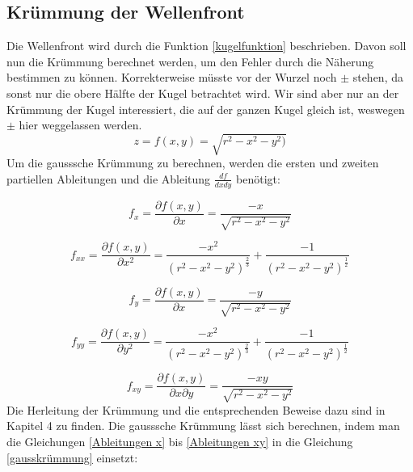 \begin{refsection}
\subsection{Krümmung der Wellenfront}
Die Wellenfront wird durch die Funktion \eqref{kugelfunktion} beschrieben. Davon soll nun die Krümmung berechnet werden, um den Fehler durch die Näherung bestimmen zu können. Korrekterweise müsste vor der Wurzel noch $\pm$ stehen, da sonst nur die obere Hälfte der Kugel betrachtet wird. Wir sind aber nur an der Krümmung der Kugel interessiert, die auf der ganzen Kugel gleich ist, weswegen  $\pm$ hier weggelassen werden.
\begin{equation}\label{kugelfunktion}
z=f(x,y)=\sqrt{r^{2}-x^{2}-y^{2})}
\end{equation}
Um die gausssche Krümmung zu berechnen, werden die ersten und zweiten partiellen Ableitungen und die Ableitung $ \frac{df}{dxdy}$ benötigt:

\begin{equation}\label{Ableitungen x}
f_{x}=\dfrac{\partial f(x,y)}{\partial x}= \dfrac{-x}{\sqrt{r^{2}-x^{2}-y^{2}}}
\end{equation}

\begin{equation}\label{Ableitungen xx}
f_{xx}=\dfrac{\partial f(x,y)}{\partial x^{2}}= \dfrac{- x^2}{(r^2 - x^2 - y^2)^{\frac{2}{3}}}+\dfrac{ - 1}{(r^2 - x^2 - y^2)^{\frac{1}{2}}}
\end{equation}

\begin{equation}\label{Ableitungen y}
f_{y} =\dfrac{\partial f(x,y)}{\partial x}= \dfrac{-y}{\sqrt{r^{2}-x^{2}-y^{2}}}
\end{equation}

\begin{equation}\label{Ableitungen yy}
f_{yy}=\dfrac{\partial f(x,y)}{\partial y^{2}}= \dfrac{- x^2}{(r^2 - x^2 - y^2)^{\frac{2}{3}}}+\dfrac{ - 1}{(r^2 - x^2 - y^2)^{\frac{1}{2}}}
\end{equation}

\begin{equation}\label{Ableitungen xy}
f_{xy}=\dfrac{\partial f(x,y)}{\partial x \partial y}=  \dfrac{-xy}{\sqrt{r^{2}-x^{2}-y^{2}}}
\end{equation}
Die Herleitung der Krümmung und die entsprechenden Beweise dazu sind in Kapitel 4 zu finden. Die gausssche Krümmung lässt sich berechnen, indem man die Gleichungen \eqref{Ableitungen x} bis \eqref{Ableitungen xy} in die Gleichung \eqref{gausskrümmung} einsetzt:  


\end{refsection}

